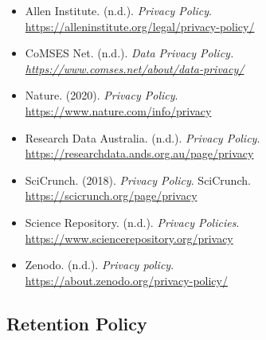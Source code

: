 \documentclass[11pt]{article}
\begin{document}
\begin{itemize}

\item Allen Institute. (n.d.). \emph{Privacy Policy}.\\
\url{https://alleninstitute.org/legal/privacy-policy/}

\item CoMSES Net. (n.d.). \emph{Data Privacy Policy.\\
\url{https://www.comses.net/about/data-privacy/}}

\item Nature. (2020). \emph{Privacy Policy}.\\
\url{https://www.nature.com/info/privacy}

\item Research Data Australia. (n.d.). \emph{Privacy Policy}.\\
\url{https://researchdata.ands.org.au/page/privacy}

\item SciCrunch. (2018). \emph{Privacy Policy}. SciCrunch.\\
\url{https://scicrunch.org/page/privacy}

\item Science Repository. (n.d.). \emph{Privacy Policies}.\\
\url{https://www.sciencerepository.org/privacy}

\item Zenodo. (n.d.). \emph{Privacy policy}.\\
\url{https://about.zenodo.org/privacy-policy/}

\end{itemize}


\subsection{Retention Policy}
\label{retention-policy}
\end{document}
